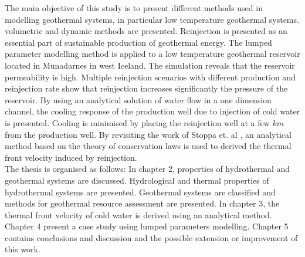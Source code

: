 The main objective of this study is to present different methods used in modelling geothermal systems, in particular low temperature geothermal systems. volumetric and dynamic methods are presented. Reinjection is presented as an essential part of sustainable production  of geothermal energy. The lumped parameter modelling method is applied to a low temperature geothermal reservoir located in Munadarnes in west Iceland. The simulation reveals that the reservoir permeability is high. Multiple reinjection scenarios with different production and reinjection rate show that reinjection increases significantly the pressure of the reservoir. By using an analytical solution of water flow in a one dimension channel, the cooling response of the production well due to injection of cold water is presented. Cooling is minimised by placing the reinjection well at a few $km$ from the production well. By revisiting the work of Stoppa et. al \cite{Waj05}, an analytical method based on the theory of conservation laws is used to derived the thermal front velocity induced by reinjection.\\

The thesis is organised as follows: In chapter 2, properties of hydrothermal and geothermal systems are discussed. Hydrological and thermal properties of hydrothermal systems are presented. Geothermal systems are classified and methods for geothermal resource assessment are presented. In chapter 3, the thermal front velocity of cold water is derived using an analytical method.
 Chapter 4 present a case study using lumped parameters modelling. Chapter 5 contains conclusions and discussion and the possible extension or improvement of this work. 







